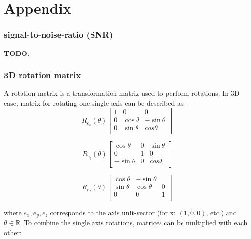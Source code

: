 \chapter{Appendix}

\subsection{signal-to-noise-ratio (SNR)}

\textbf{TODO:}

\subsection{3D rotation matrix}
\label{app:3DrotationMatrix}
A rotation matrix is a transformation matrix used to perform rotations.
In 3D case, matrix for rotating one single axis can be described as:
\begin{equation}
    R_{e_x} (\theta)
    \begin{bmatrix}
        1 & 0 & 0\\
        0 & \cos \theta & - \sin \theta \\
        0 & \sin \theta & cos \theta \\
    \end{bmatrix}
\end{equation}

\begin{equation}
    R_{e_y} (\theta)
    \begin{bmatrix}
        \cos \theta & 0 & \sin \theta\\
        0 & 1 & 0 \\
        - \sin \theta & 0 & cos \theta \\
    \end{bmatrix}
\end{equation}

\begin{equation}
    R_{e_z} (\theta)
    \begin{bmatrix}
        \cos \theta & - \sin \theta\\
        \sin \theta & \cos \theta & 0 \\
        0 & 0 & 1 \\
    \end{bmatrix}
\end{equation}

where $e_x, e_y, e_z$ corresponds to the axis unit-vector (for x: $(1,0,0)$, etc.) and $\theta \in \mathbb{R}$.
To combine the single axis rotations, matrices can be multiplied with each other:

